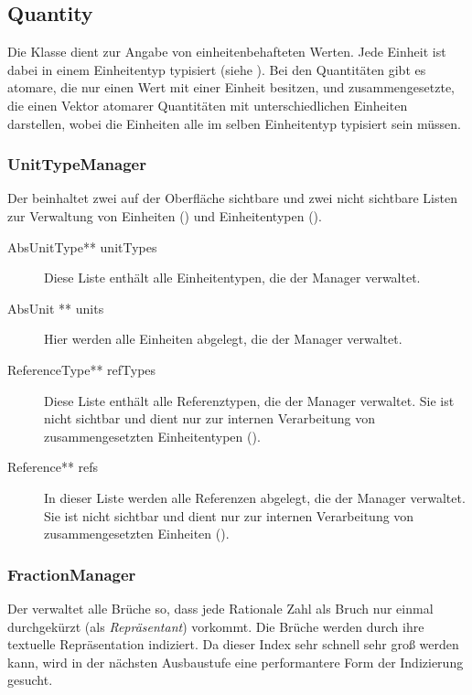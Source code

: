 \subsection{Quantity}
Die Klasse  dient zur Angabe von einheitenbehafteten Werten. Jede Einheit ist dabei in einem Einheitentyp typisiert (siehe ). Bei den Quantitäten gibt es atomare, die nur einen Wert mit einer Einheit besitzen, und zusammengesetzte, die einen Vektor atomarer Quantitäten mit unterschiedlichen Einheiten darstellen, wobei die Einheiten alle im selben Einheitentyp typisiert sein müssen.


\subsubsection{UnitTypeManager}

Der  beinhaltet zwei auf der Oberfläche sichtbare und zwei nicht sichtbare Listen zur Verwaltung von Einheiten () und Einheitentypen ().

\begin{description}
\item[AbsUnitType** unitTypes] Diese Liste enthält alle Einheitentypen, die der Manager verwaltet.
\item[AbsUnit ** units] Hier werden alle Einheiten abgelegt, die der Manager verwaltet.
\item[ReferenceType** refTypes] Diese Liste enthält alle Referenztypen, die der Manager verwaltet. Sie ist nicht sichtbar und dient nur zur internen Verarbeitung von zusammengesetzten Einheitentypen ().
\item[Reference** refs] In dieser Liste werden alle Referenzen abgelegt, die der Manager verwaltet. Sie ist nicht sichtbar und dient nur zur internen Verarbeitung von zusammengesetzten Einheiten ().
\end{description}

\subsubsection{FractionManager}\label{FractionManager}

Der  verwaltet alle Brüche so, dass jede Rationale Zahl als Bruch nur einmal durchgekürzt (als \emph{Repräsentant}) vorkommt. Die Brüche werden durch ihre textuelle Repräsentation indiziert. Da dieser Index sehr schnell sehr groß werden kann, wird in der nächsten Ausbaustufe eine performantere Form der Indizierung gesucht.

